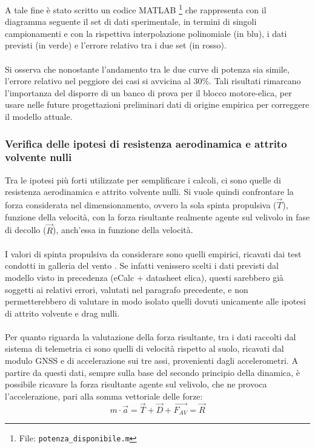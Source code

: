 \documentclass[12pt]{article}
\begin{document}
\noindent
A tale fine è stato scritto un codice MATLAB \footnote{File: \texttt{potenza\_disponibile.m}} che rappresenta con il diagramma seguente il set di dati sperimentale, in termini di singoli campionamenti e con la rispettiva interpolazione polinomiale (in blu), i dati previsti (in verde) e l'errore relativo tra i due set (in rosso). 
\\\\
Si osserva che nonostante l'andamento tra le due curve di potenza sia simile, l'errore relativo nel peggiore dei casi si avvicina al 30\%. Tali risultati rimarcano l'importanza del disporre di un banco di prova per il blocco motore-elica, per usare nelle future progettazioni preliminari dati di origine empirica per correggere il modello attuale.

\subsubsection{Verifica delle ipotesi di resistenza aerodinamica e attrito volvente nulli}
Tra le ipotesi più forti utilizzate per semplificare i calcoli, ci sono quelle di resistenza aerodinamica e attrito volvente nulli. Si vuole quindi confrontare la forza considerata nel dimensionamento, ovvero la sola spinta propulsiva ($\overrightarrow{T}$), funzione della velocità, con la forza risultante realmente agente sul velivolo in fase di decollo ($\overrightarrow{R}$), anch'essa in funzione della velocità. 
\\\\
I valori di spinta propulsiva da considerare sono quelli empirici, ricavati dai test condotti in galleria del vento \cite{windtunnel}. Se infatti venissero scelti i dati previsti dal modello visto in precedenza (eCalc + datasheet elica), questi sarebbero già soggetti ai relativi errori, valutati nel paragrafo precedente, e non permetterebbero di valutare in modo isolato quelli dovuti unicamente alle ipotesi di attrito volvente e drag nulli.
\\\\
Per quanto riguarda la valutazione della forza risultante, tra i dati raccolti dal sistema di telemetria ci sono quelli di velocità rispetto al suolo, ricavati dal modulo GNSS e di accelerazione sui tre assi, provenienti dagli accelerometri. A partire da questi dati, sempre sulla base del secondo principio della dinamica, è possibile ricavare la forza risultante agente sul velivolo, che ne provoca l'accelerazione, pari alla somma vettoriale delle forze:
\begin{equation}
m \cdot \overrightarrow{a} = \overrightarrow{T} + \overrightarrow{D} + \overrightarrow{F_{AV}} = \overrightarrow{R}
\end{equation}
\end{document}
